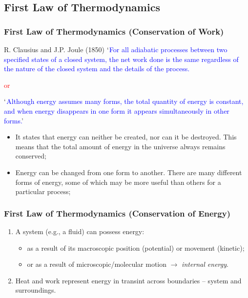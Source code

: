 \documentclass[10pt,compress]{beamer}
\begin{document}
\subsection{First Law of Thermodynamics}

\begin{frame}
 \frametitle{First Law of Thermodynamics (Conservation of Work)}

 \begin{block}{R. Clausius and J.P. Joule (1850)}
  \textcolor{blue}{$\lq$For all adiabatic processes between two specified states of a closed system, the net work done is the same regardless of the nature of the closed system and the details of the process.}
  \begin{center}
   \textcolor{red}{or}
  \end{center}
  \textcolor{blue}{$\lq$Although energy assumes many forms, the total quantity of energy is constant, and when energy disappears in one form it appears simultaneously in other forms.}'
 \end{block}


 \begin{itemize}
  \item<2-> It states that energy can neither be created, nor can it be destroyed. This means that the total amount of energy in the universe always remains conserved;
  \item<3-> Energy can be changed from one form to another. There are many different forms of energy, some of which may be more useful than others for a particular process;
 \end{itemize}

\normalsize
\end{frame}

\begin{frame}
 \frametitle{First Law of Thermodynamics (Conservation of Energy)}
   \begin{enumerate}
      \item<1-> A system (e.g., a fluid) can possess energy:
        \begin{itemize}
          \item<1-> as a result of its macroscopic position (potential) or movement (kinetic);
          \item<1-> or as a result of microscopic/molecular motion $\rightarrow$ {\it internal energy}.
        \end{itemize}

      \item<3-> Heat and work represent energy in transint across boundaries -- system and surroundings.

   \end{enumerate}
\normalsize
\end{frame}
\end{document}
